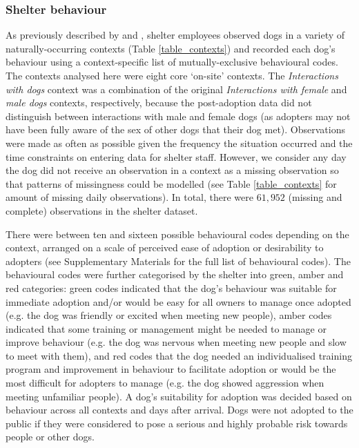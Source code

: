 \documentclass[12pt]{article}
\begin{document}
\subsubsection{Shelter behaviour}
As previously described by \textcite{goold2017aggressiveness} and \textcite{goold2017modelling}, shelter employees observed dogs in a variety of naturally-occurring contexts (Table \ref{table_contexts}) and recorded each dog's behaviour using a context-specific list of mutually-exclusive behavioural codes. The contexts analysed here were eight core ‘on-site' contexts. The \textit{Interactions with dogs} context was a combination of the original \textit{Interactions with female} and \textit{male dogs} contexts, respectively, because the post-adoption data did not distinguish between interactions with male and female dogs (as adopters may not have been fully aware of the sex of other dogs that their dog met). Observations were made as often as possible given the frequency the situation occurred and the time constraints on entering data for shelter staff. However, we consider any day the dog did not receive an observation in a context as a missing observation so that patterns of missingness could be modelled (see Table \ref{table_contexts} for amount of missing daily observations). In total, there were $61,952$ (missing and complete) observations in the shelter dataset.

There were between ten and sixteen possible behavioural codes depending on the context, arranged on a scale of perceived ease of adoption or desirability to adopters (see Supplementary Materials for the full list of behavioural codes). The behavioural codes were further categorised by the shelter into green, amber and red categories: green codes indicated that the dog's behaviour was suitable for immediate adoption and/or would be easy for all owners to manage once adopted (e.g. the dog was friendly or excited when meeting new people), amber codes indicated that some training or management might be needed to manage or improve behaviour (e.g. the dog was nervous when meeting new people and slow to meet with them), and red codes that the dog needed an individualised training program and improvement in behaviour to facilitate adoption or would be the most difficult for adopters to manage (e.g. the dog showed aggression when meeting unfamiliar people). A dog's suitability for adoption was decided based on behaviour across all contexts and days after arrival. Dogs were not adopted to the public if they were considered to pose a serious and highly probable risk towards people or other dogs.
\end{document}
